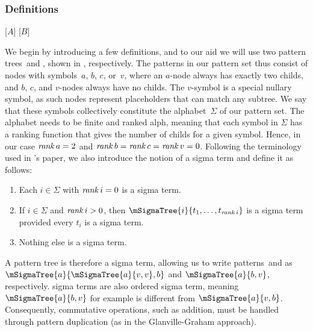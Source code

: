 {\subsubsection{Definitions}

[$\mathit{A}$]
[$\mathit{B}$]

We begin by introducing a few definitions, and to our aid we will use two
\glspl{pattern tree}~\tpatI and \tpatII, shown in
, respectively.
%
The patterns in our
\gls{pattern set} thus consist of \glspl{node} with \glspl{symbol}~$a$, $b$,
$c$, or~$v$, where an \mbox{$a$-node} always has exactly two \glspl{child}, and
$b$, $c$, and \mbox{$v$-nodes} always have no \glspl{child}.
%
The
\mbox{$v$-symbol} is a special \gls{nullary symbol}, as such \glspl{node}
represent placeholders that can match any \gls{subtree}.
%
We say that these
\glspl{symbol} collectively constitute the \gls{alphabet}~$\Sigma$ of our
\gls{pattern set}.
%
The \gls{alphabet} needs to be finite and \gls{ranked alph},
meaning that each \gls{symbol} in $\Sigma$ has a \gls{ranking function} that
gives the number of \glspl{child} for a given \gls{symbol}.
%
Hence, in our case
\mbox{$\operatorname{\textrm{\textit{rank}}}{a} = 2$} and \mbox{$\operatorname{\textrm{\textit{rank}}}{b} = \operatorname{\textrm{\textit{rank}}}{c} = \operatorname{\textrm{\textit{rank}}}{v} =
  0$}.
%
Following the terminology used in \citeauthor{Hoffmann1982}'s paper, we
also introduce the notion of a \gls{sigma term} and define it as follows:
\begin{enumerate}
  \item Each \mbox{$i \in \Sigma$} with \mbox{$\operatorname{\textrm{\textit{rank}}}{i} = 0$} is a \gls{sigma
    term}.
  \item If \mbox{$i \in \Sigma$} and \mbox{$\operatorname{\textrm{\textit{rank}}}{i} > 0$}, then
    \mbox{$\mSigmaTree{i}{t_1, \ldots, t_{\mRank{i}}}$} is a \gls{sigma term}
    provided every $t_i$ is a \gls{sigma term}.
  \item Nothing else is a \mbox{\gls{sigma term}}.
\end{enumerate}
A \gls{pattern tree} is therefore a \gls{sigma term}, allowing us to write
\glspl{pattern}~\tpatI and \tpatII as \mbox{$\mSigmaTree{a}{\mSigmaTree{a}{v,
      v}, b}$} and \mbox{$\mSigmaTree{a}{b, v}$}, respectively.
%
\glspl{sigma
  term} are also \gls{ordered sigma term}, meaning \mbox{$\mSigmaTree{a}{b, v}$}
for example is different from \mbox{$\mSigmaTree{a}{v, b}$}.
%
Consequently,
commutative operations, such as addition, must be handled through \gls{pattern}
duplication (as in the \gls{Glanville-Graham approach}).

}
